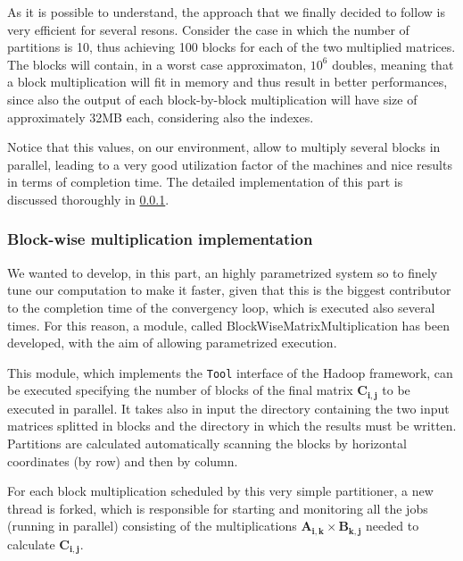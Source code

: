 As it is possible to understand, the approach that we finally decided to follow is very efficient for several resons.
Consider the case in which the number of partitions is 10, thus achieving 100 blocks for each of the two multiplied matrices.
The blocks will contain, in a worst case approximaton, $10^6$ doubles, meaning that a block multiplication will fit in memory and thus result in better performances, since also the output of each block-by-block multiplication will have size of approximately 32MB each, considering also the indexes.

Notice that this values, on our environment, allow to multiply several blocks in parallel, leading to a very good utilization
factor of the machines and nice results in terms of completion time.
The detailed implementation of this part is discussed thoroughly in \ref{blockmul}.

\subsubsection{Block-wise multiplication implementation}
\label{blockmul}
We wanted to develop, in this part, an highly parametrized system so to finely tune our computation to make it faster,
given that this is the biggest contributor to the completion time of the convergency loop, which is executed also several times.
For this reason, a module, called BlockWiseMatrixMultiplication has been developed, with the aim of allowing parametrized execution.

This module, which implements the \texttt{Tool} interface of the Hadoop framework, can be executed specifying the number
of blocks of the final matrix $\mathbf{C_{i,j}}$ to be executed in parallel. It takes also in input the directory containing
the two input matrices splitted in blocks and the directory in which the results must be written. Partitions are 
calculated automatically scanning the blocks by horizontal coordinates (by row) and then by column.

For each block multiplication scheduled by this very simple partitioner, a new thread is forked, which is responsible
for starting and monitoring all the jobs (running in parallel) consisting of the multiplications $\mathbf{A_{i,k}} \times \mathbf{B_{k,j}}$ needed to calculate $\mathbf{C_{i,j}}$.

